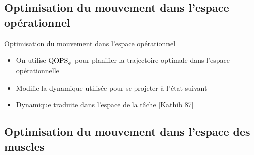 
\subsection{Optimisation du mouvement dans l'espace opérationnel}

\begin{frame}{Optimisation du mouvement dans l'espace opérationnel}
    \begin{itemize}
        \item On utilise $\text{QOPS}_\phi$ pour planifier la trajectoire optimale dans l'espace opérationnelle
        \item Modifie la dynamique utilisée pour se projeter à l'état suivant
        \item Dynamique traduite dans l'espace de la tâche $[$Kathib 87$]$
    \end{itemize}
    \begin{figure}
        \centering
        
    \end{figure}
\end{frame}


\subsection{Optimisation du mouvement dans l'espace des muscles}

